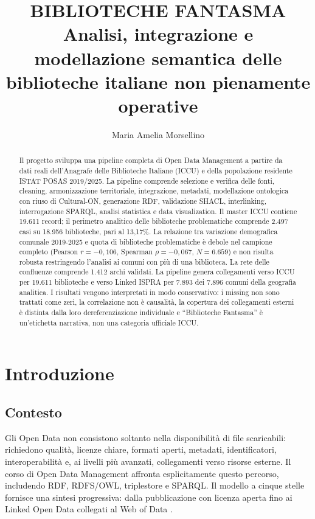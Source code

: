 \documentclass[11pt,a4paper]{article}
\title{\textbf{BIBLIOTECHE FANTASMA}\\[0.3em]\large Analisi, integrazione e modellazione semantica delle biblioteche italiane non pienamente operative}
\author{Maria Amelia Morsellino}
\date{}
\begin{document}
\maketitle
\begin{abstract}
Il progetto sviluppa una pipeline completa di Open Data Management a partire da dati reali dell'Anagrafe delle Biblioteche Italiane (ICCU) e della popolazione residente ISTAT POSAS 2019/2025. La pipeline comprende selezione e verifica delle fonti, cleaning, armonizzazione territoriale, integrazione, metadati, modellazione ontologica con riuso di Cultural-ON, generazione RDF, validazione SHACL, interlinking, interrogazione SPARQL, analisi statistica e data visualization. Il master ICCU contiene 19.611 record; il perimetro analitico delle biblioteche problematiche comprende 2.497 casi su 18.956 biblioteche, pari al 13,17\%. La relazione tra variazione demografica comunale 2019-2025 e quota di biblioteche problematiche è debole nel campione completo (Pearson $r=-0{,}106$, Spearman $\rho=-0{,}067$, $N=6.659$) e non risulta robusta restringendo l'analisi ai comuni con più di una biblioteca. La rete delle confluenze comprende 1.412 archi validati. La pipeline genera collegamenti verso ICCU per 19.611 biblioteche e verso Linked ISPRA per 7.893 dei 7.896 comuni della geografia analitica. I risultati vengono interpretati in modo conservativo: i missing non sono trattati come zeri, la correlazione non è causalità, la copertura dei collegamenti esterni è distinta dalla loro dereferenziazione individuale e ``Biblioteche Fantasma'' è un'etichetta narrativa, non una categoria ufficiale ICCU.
\end{abstract}
\tableofcontents
\clearpage

\section{Introduzione}
\subsection{Contesto}
Gli Open Data non consistono soltanto nella disponibilità di file scaricabili: richiedono qualità, licenze chiare, formati aperti, metadati, identificatori, interoperabilità e, ai livelli più avanzati, collegamenti verso risorse esterne. Il corso di Open Data Management affronta esplicitamente questo percorso, includendo RDF, RDFS/OWL, triplestore e SPARQL. Il modello a cinque stelle fornisce una sintesi progressiva: dalla pubblicazione con licenza aperta fino ai Linked Open Data collegati al Web of Data \cite{five_star,heathbizer}.
\end{document}
